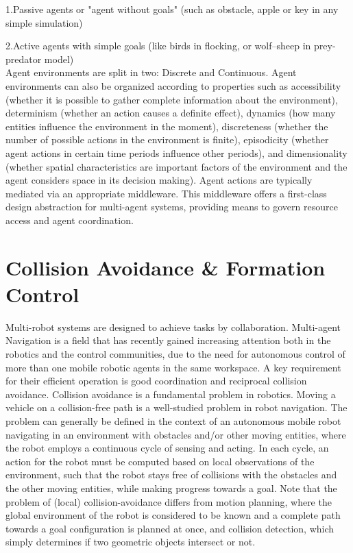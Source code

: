 \documentclass[12pt]{report}
\begin{document}
		1.Passive agents or "agent without goals" (such as obstacle, apple or key in any simple simulation)
		
    	2.Active agents with simple goals (like birds in flocking, or wolf–sheep in prey-predator model)\\
    	
Agent environments are split in two: Discrete and Continuous. Agent environments can also be organized according to properties such as accessibility (whether it is possible to gather complete information about the environment), determinism (whether an action causes a definite effect), dynamics (how many entities influence the environment in the moment), discreteness (whether the number of possible actions in the environment is finite), episodicity (whether agent actions in certain time periods influence other periods), and dimensionality (whether spatial characteristics are important factors of the environment and the agent considers space in its decision making). Agent actions are typically mediated via an appropriate middleware. This middleware offers a first-class design abstraction for multi-agent systems, providing means to govern resource access and agent coordination.

\newpage
\section{Collision Avoidance \& Formation Control}

Multi-robot systems are designed to achieve tasks by collaboration. Multi-agent Navigation is a field that has recently gained increasing attention both in  the robotics and the control communities, due to the need for autonomous control of more than one mobile robotic agents in the same workspace. A key requirement for their efficient operation is good coordination and reciprocal collision avoidance. Collision avoidance is a fundamental problem in robotics. Moving a vehicle on a collision-free path is a well-studied problem in robot navigation. The problem can generally be defined in the context of an autonomous mobile robot navigating in an environment with obstacles and/or other moving entities, where the robot employs a continuous cycle of sensing and acting. In each cycle, an action for the robot must be computed based on local observations of the environment, such that the robot stays free of collisions with the obstacles and the other moving entities, while making progress towards a goal. Note that the problem of (local) collision-avoidance differs from motion planning, where the global environment of the robot is considered to be known and a complete path towards a goal configuration is planned at once, and collision detection, which simply determines if two geometric objects intersect or not. 
\end{document}
